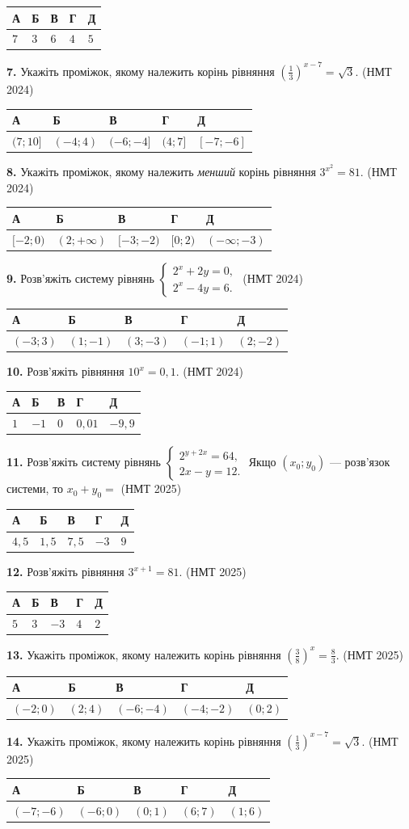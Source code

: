 \documentclass[14pt]{extarticle}
\newcommand{\answerTable}[5]{
\begin{center}
\begin{tabular}{|*{5}{>{\centering\arraybackslash}m{2.8cm}|}}
\hline
\rule[-0.3cm]{0pt}{0.8cm}\textbf{А} & \textbf{Б} & \textbf{В} & \textbf{Г} & \textbf{Д} \\
\hline
\rule[-0.4cm]{0pt}{1.0cm}#1 & \rule[-0.4cm]{0pt}{1.0cm}#2 & \rule[-0.4cm]{0pt}{1.0cm}#3 & \rule[-0.4cm]{0pt}{1.0cm}#4 & \rule[-0.4cm]{0pt}{1.0cm}#5 \\
\hline
\end{tabular}
\end{center}
}
\newcommand{\nmtyear}[1]{\hfill{\small\color{yearcolor}(НМТ #1)}}
\begin{document}
\answerTable{$7$}{$3$}{$6$}{$4$}{$5$}

\noindent\textbf{7.} Укажіть проміжок, якому належить корінь рівняння $\left(\displaystyle\frac{1}{3}\right)^{x-7} = \sqrt{3}$. \nmtyear{2024}

\answerTable{$(7; 10]$}{$(-4; 4)$}{$(-6; -4]$}{$(4; 7]$}{$[-7; -6]$}

\noindent\textbf{8.} Укажіть проміжок, якому належить \textit{менший} корінь рівняння $3^{x^2} = 81$. \nmtyear{2024}

\answerTable{$[-2; 0)$}{$(2; +\infty)$}{$[-3; -2)$}{$[0; 2)$}{$(-\infty; -3)$}

\noindent\textbf{9.} Розв'яжіть систему рівнянь $\begin{cases} 2^x + 2y = 0, \\ 2^x - 4y = 6. \end{cases}$ \nmtyear{2024}

\answerTable{$(-3; 3)$}{$(1; -1)$}{$(3; -3)$}{$(-1; 1)$}{$(2; -2)$}

\noindent\textbf{10.} Розв'яжіть рівняння $10^x = 0{,}1$. \nmtyear{2024}

\answerTable{$1$}{$-1$}{$0$}{$0{,}01$}{$-9{,}9$}



\noindent\textbf{11.} Розв'яжіть систему рівнянь $\begin{cases} 2^{y+2x} = 64, \\ 2x - y = 12. \end{cases}$ Якщо $(x_0; y_0)$ --- розв'язок системи, то $x_0 + y_0 =$ \nmtyear{2025}

\answerTable{$4{,}5$}{$1{,}5$}{$7{,}5$}{$-3$}{$9$}

\noindent\textbf{12.} Розв'яжіть рівняння $3^{x+1} = 81$. \nmtyear{2025}

\answerTable{$5$}{$3$}{$-3$}{$4$}{$2$}

\noindent\textbf{13.} Укажіть проміжок, якому належить корінь рівняння $\left(\displaystyle\frac{3}{8}\right)^x = \displaystyle\frac{8}{3}$. \nmtyear{2025}

\answerTable{$(-2; 0)$}{$(2; 4)$}{$(-6; -4)$}{$(-4; -2)$}{$(0; 2)$}

\noindent\textbf{14.} Укажіть проміжок, якому належить корінь рівняння $\left(\displaystyle\frac{1}{3}\right)^{x-7} = \sqrt{3}$. \nmtyear{2025}

\answerTable{$(-7; -6)$}{$(-6; 0)$}{$(0; 1)$}{$(6; 7)$}{$(1; 6)$}
\end{document}
